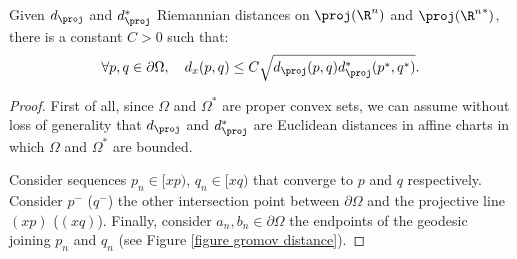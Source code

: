 \begin{lemma} \label{lemma gromov smaller euclid}
Given $d_\proj$ and $d_\proj^*$ Riemannian distances on $\proj(\R^n)$ and $\proj({\R^n}^*)$, there is a constant $C>0$ such that:
\[ \forall p,q\in\partial \Omega,\quad d_x(p,q) \leq C \sqrt{d_\proj(p,q) d_\proj^*(p^*,q^*)}.\]
\end{lemma}

\begin{proof}
First of all, since $\Omega$ and $\Omega^*$ are proper convex sets, we can assume without loss of generality that $d_\proj$ and $d_\proj^*$ are Euclidean distances in affine charts in which $\Omega$ and $\Omega^*$ are bounded.

Consider sequences $p_n\in[xp)$, $q_n\in[xq)$ that converge to $p$ and $q$ respectively. Consider $p^-$ (\resp $q^-$) the other intersection point between $\partial \Omega$ and the projective line $(xp)$ (\resp $(xq)$). Finally, consider $a_n,b_n\in \partial \Omega$ the endpoints of the geodesic joining $p_n$ and $q_n$ (see Figure \ref{figure gromov distance}).


\end{proof}
